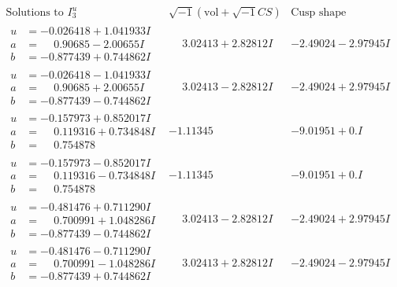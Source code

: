 \documentclass[1p]{elsarticle_modified}
\theoremstyle{definition}
\newcommand{\I}{\sqrt{-1}}
\begin{document}
$$\begin{array}{c|c|c}  
\text{Solutions to }I^u_{3}& \I (\text{vol} + \sqrt{-1}CS) & \text{Cusp shape}\\
 \hline 
\begin{aligned}
u &= -0.026418 + 1.041933 I \\
a &= \phantom{-}0.90685 - 2.00655 I \\
b &= -0.877439 + 0.744862 I\end{aligned}
 & \phantom{-}3.02413 + 2.82812 I & -2.49024 - 2.97945 I \\ \hline\begin{aligned}
u &= -0.026418 - 1.041933 I \\
a &= \phantom{-}0.90685 + 2.00655 I \\
b &= -0.877439 - 0.744862 I\end{aligned}
 & \phantom{-}3.02413 - 2.82812 I & -2.49024 + 2.97945 I \\ \hline\begin{aligned}
u &= -0.157973 + 0.852017 I \\
a &= \phantom{-}0.119316 + 0.734848 I \\
b &= \phantom{-}0.754878\phantom{ +0.000000I}\end{aligned}
 & -1.11345\phantom{ +0.000000I} & -9.01951 + 0. I\phantom{ +0.000000I} \\ \hline\begin{aligned}
u &= -0.157973 - 0.852017 I \\
a &= \phantom{-}0.119316 - 0.734848 I \\
b &= \phantom{-}0.754878\phantom{ +0.000000I}\end{aligned}
 & -1.11345\phantom{ +0.000000I} & -9.01951 + 0. I\phantom{ +0.000000I} \\ \hline\begin{aligned}
u &= -0.481476 + 0.711290 I \\
a &= \phantom{-}0.700991 + 1.048286 I \\
b &= -0.877439 - 0.744862 I\end{aligned}
 & \phantom{-}3.02413 - 2.82812 I & -2.49024 + 2.97945 I \\ \hline\begin{aligned}
u &= -0.481476 - 0.711290 I \\
a &= \phantom{-}0.700991 - 1.048286 I \\
b &= -0.877439 + 0.744862 I\end{aligned}
 & \phantom{-}3.02413 + 2.82812 I & -2.49024 - 2.97945 I \\ \hline\begin{aligned}

\end{aligned}
\end{array}$$
\end{document}
